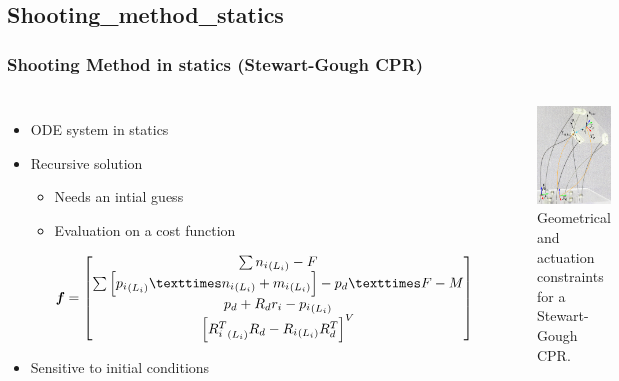 \documentclass[compress]{thesisbeamer}
\begin{document}
		\subsection{Shooting_method_statics}
        \begin{frame}
        	\frametitle{Shooting Method in statics (Stewart-Gough CPR)}
        	\begin{columns}
			\begin{itemize}%
  				\item ODE system in statics
  				\item Recursive solution
  				\begin{itemize}			
  					\item Needs an intial guess
  					\item Evaluation on a cost function  
  					\begin{fleqn}
  					\begin{equation}
  						\textbf{\textit{f}} = 
  						\begin{bmatrix}
  							\sum{ {{n}_{i}}_{\left({L}_{i} \right)} }- F \\
  							\sum{ \left[{{p}_{i}}_{\left({L}_{i} \right)} × {{n}_{i}}_{\left({L}_{i} \right)} + {{m}_{i}}_{\left({L}_{i} \right)} \right] } - {p}_{d} × F-M \\
  							{p}_{d} + {R}_{d} {r}_{i} - {{p}_{i}}_{\left({L}_{i} \right)} \\
  							{\left[{{R}_{i}^{T}}_{\left({L}_{i} \right)} {R}_{d} - {{R}_{i}}_{\left({L}_{i} \right)} {R}_{d}^{T} \right]}^{V} 
  						\end{bmatrix}
  					\end{equation}\vfill
  					\end{fleqn}
  				\end{itemize}
  				\item Sensitive to initial conditions
 			\end{itemize}
			\begin{figure}[h]
				\centering
				\includegraphics[height=0.7\textheight]{images/BVP}
				\caption{Geometrical and actuation constraints for a Stewart-Gough CPR.}
			\end{figure}
			\end{columns}
		\end{frame}
		
\end{document}
